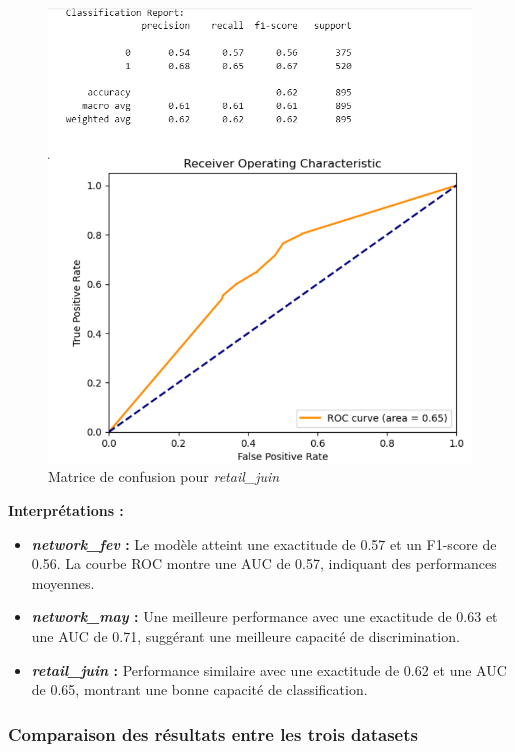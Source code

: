 \begin{figure}[H]
    \centering
    \begin{minipage}{0.45\textwidth}
        \centering
        \includegraphics[width=\linewidth]{capture_modele_8.png}
        \caption{Matrice de confusion pour \textit{retail\_juin}}
    \end{minipage}
\end{figure}

\textbf{Interprétations :}
\begin{itemize}
    \item \textbf{\textit{network\_fev} :} Le modèle atteint une exactitude de 0.57 et un F1-score de 0.56. La courbe ROC montre une AUC de 0.57, indiquant des performances moyennes.
    \item \textbf{\textit{network\_may} :} Une meilleure performance avec une exactitude de 0.63 et une AUC de 0.71, suggérant une meilleure capacité de discrimination.
    \item \textbf{\textit{retail\_juin} :} Performance similaire avec une exactitude de 0.62 et une AUC de 0.65, montrant une bonne capacité de classification.
\end{itemize}

\subsubsection{Comparaison des résultats entre les trois datasets}

